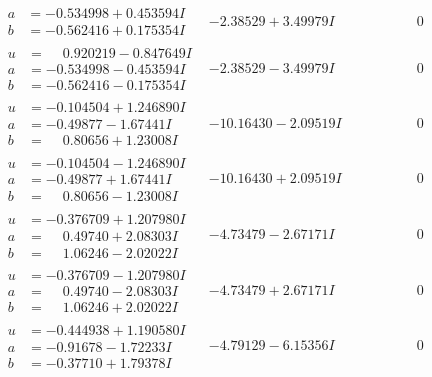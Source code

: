 \documentclass[1p]{elsarticle_modified}
\theoremstyle{definition}
\begin{document}
$$\begin{array}{c|c|c}
\begin{aligned}
a &= -0.534998 + 0.453594 I \\
b &= -0.562416 + 0.175354 I\end{aligned}
 & -2.38529 + 3.49979 I & \phantom{-0.000000 } 0 \\ \hline\begin{aligned}
u &= \phantom{-}0.920219 - 0.847649 I \\
a &= -0.534998 - 0.453594 I \\
b &= -0.562416 - 0.175354 I\end{aligned}
 & -2.38529 - 3.49979 I & \phantom{-0.000000 } 0 \\ \hline\begin{aligned}
u &= -0.104504 + 1.246890 I \\
a &= -0.49877 - 1.67441 I \\
b &= \phantom{-}0.80656 + 1.23008 I\end{aligned}
 & -10.16430 - 2.09519 I & \phantom{-0.000000 } 0 \\ \hline\begin{aligned}
u &= -0.104504 - 1.246890 I \\
a &= -0.49877 + 1.67441 I \\
b &= \phantom{-}0.80656 - 1.23008 I\end{aligned}
 & -10.16430 + 2.09519 I & \phantom{-0.000000 } 0 \\ \hline\begin{aligned}
u &= -0.376709 + 1.207980 I \\
a &= \phantom{-}0.49740 + 2.08303 I \\
b &= \phantom{-}1.06246 - 2.02022 I\end{aligned}
 & -4.73479 - 2.67171 I & \phantom{-0.000000 } 0 \\ \hline\begin{aligned}
u &= -0.376709 - 1.207980 I \\
a &= \phantom{-}0.49740 - 2.08303 I \\
b &= \phantom{-}1.06246 + 2.02022 I\end{aligned}
 & -4.73479 + 2.67171 I & \phantom{-0.000000 } 0 \\ \hline\begin{aligned}
u &= -0.444938 + 1.190580 I \\
a &= -0.91678 - 1.72233 I \\
b &= -0.37710 + 1.79378 I\end{aligned}
 & -4.79129 - 6.15356 I & \phantom{-0.000000 } 0 \\ \hline\begin{aligned}

\end{aligned}
\end{array}$$
\end{document}
